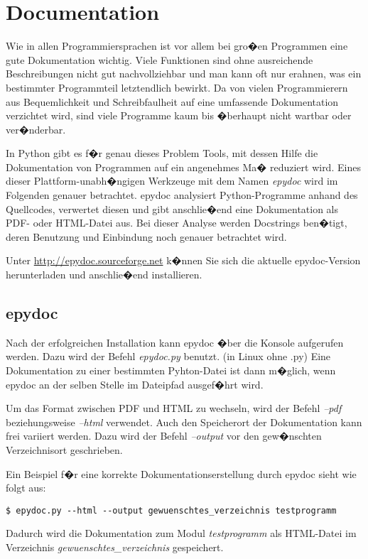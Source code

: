 
\section{Documentation}
\label{documentation:sec:Dokumentation}

Wie in allen Programmiersprachen ist vor allem bei gro�en Programmen eine gute Dokumentation wichtig. Viele Funktionen sind ohne ausreichende Beschreibungen nicht gut nachvollziehbar und man kann oft nur erahnen, was ein bestimmter Programmteil letztendlich bewirkt. Da von vielen Programmierern aus Bequemlichkeit und Schreibfaulheit auf eine umfassende Dokumentation verzichtet wird, sind viele Programme kaum bis �berhaupt nicht wartbar oder ver�nderbar. 

In Python gibt es f�r genau dieses Problem Tools, mit dessen Hilfe die Dokumentation von Programmen auf ein angenehmes Ma� reduziert wird. Eines dieser Plattform-unabh�ngigen Werkzeuge mit dem Namen \textit{epydoc} wird im Folgenden genauer betrachtet.  epydoc analysiert Python-Programme anhand des Quellcodes, verwertet diesen und gibt anschlie�end eine Dokumentation als PDF- oder HTML-Datei aus. Bei dieser Analyse werden Docstrings ben�tigt, deren Benutzung und Einbindung noch genauer betrachtet wird.

Unter \url{http://epydoc.sourceforge.net} k�nnen Sie sich die aktuelle epydoc-Version herunterladen und anschlie�end installieren. 


\subsection*{epydoc}
\label{documentation:sec:epydoc}

Nach der erfolgreichen Installation kann epydoc �ber die Konsole aufgerufen werden. Dazu wird der Befehl \textit{epydoc.py} benutzt. (in Linux ohne .py) 
Eine Dokumentation zu einer bestimmten Pyhton-Datei ist dann m�glich, wenn epydoc an der selben Stelle im Dateipfad ausgef�hrt wird. 

Um das Format zwischen PDF und HTML zu wechseln, wird der Befehl \textit{--pdf} beziehungsweise \textit{--html} verwendet. Auch den Speicherort der Dokumentation kann frei variiert werden. Dazu wird der Befehl \textit{--output} vor den gew�nschten Verzeichnisort geschrieben. 

Ein Beispiel f�r eine korrekte Dokumentationserstellung durch epydoc sieht wie folgt aus:
\begin{lstlisting}[label=documentation:lst:epydocbsp]
$ epydoc.py --html --output gewuenschtes_verzeichnis testprogramm
\end{lstlisting}
Dadurch wird die Dokumentation zum Modul \textit{testprogramm} als HTML-Datei im Verzeichnis \textit{gewuenschtes_verzeichnis} gespeichert.


